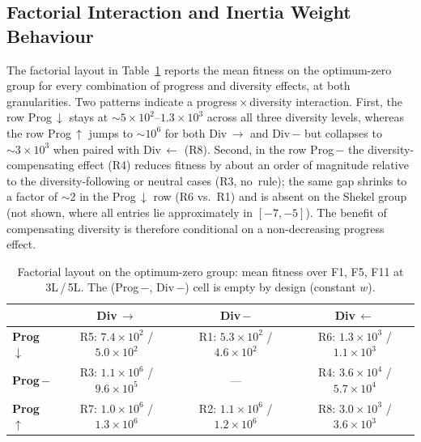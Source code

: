 \documentclass[runningheads]{llncs}
\begin{document}
\subsection{Factorial Interaction and Inertia Weight Behaviour}\label{sec:factorial}

The factorial layout in Table~\ref{tab:factorial} reports the mean fitness on the optimum-zero group for every combination of progress and diversity effects, at both granularities. Two patterns indicate a progress\,$\times$\,diversity interaction. First, the row Prog\,$\downarrow$ stays at $\sim 5\times 10^2$--$1.3\times 10^3$ across all three diversity levels, whereas the row Prog\,$\uparrow$ jumps to $\sim 10^6$ for both Div\,$\rightarrow$ and Div\,$-$ but collapses to $\sim 3\times 10^3$ when paired with Div\,$\leftarrow$ (R8). Second, in the row Prog\,$-$ the diversity-compensating effect (R4) reduces fitness by about an order of magnitude relative to the diversity-following or neutral cases (R3, no~rule); the same gap shrinks to a factor of $\sim 2$ in the Prog\,$\downarrow$ row (R6 vs.~R1) and is absent on the Shekel group (not shown, where all entries lie approximately in $[-7, -5]$). The benefit of compensating diversity is therefore conditional on a non-decreasing progress effect.

\vspace{-0.5cm}

\begin{table}[H]
\scriptsize
\caption{Factorial layout on the optimum-zero group: mean fitness over F1, F5, F11 at 3L\,/\,5L. The (Prog\,$-$, Div\,$-$) cell is empty by design (constant $w$).}\label{tab:factorial}
\centering
\setlength{\tabcolsep}{6pt}
\renewcommand{\arraystretch}{1.15}
\begin{tabular}{l|ccc}
\toprule
 & \textbf{Div\,$\rightarrow$} & \textbf{Div\,$-$} & \textbf{Div\,$\leftarrow$} \\
\midrule
\textbf{Prog\,$\downarrow$} & R5: $7.4\!\times\!10^{2}$ / $5.0\!\times\!10^{2}$ & R1: $5.3\!\times\!10^{2}$ / $4.6\!\times\!10^{2}$ & R6: $1.3\!\times\!10^{3}$ / $1.1\!\times\!10^{3}$ \\
\textbf{Prog\,$-$}          & R3: $1.1\!\times\!10^{6}$ / $9.6\!\times\!10^{5}$ & ---                                              & R4: $3.6\!\times\!10^{4}$ / $5.7\!\times\!10^{4}$ \\
\textbf{Prog\,$\uparrow$}   & R7: $1.0\!\times\!10^{6}$ / $1.3\!\times\!10^{6}$ & R2: $1.1\!\times\!10^{6}$ / $1.2\!\times\!10^{6}$ & R8: $3.0\!\times\!10^{3}$ / $3.6\!\times\!10^{3}$ \\
\bottomrule
\end{tabular}
\end{table}
\end{document}
